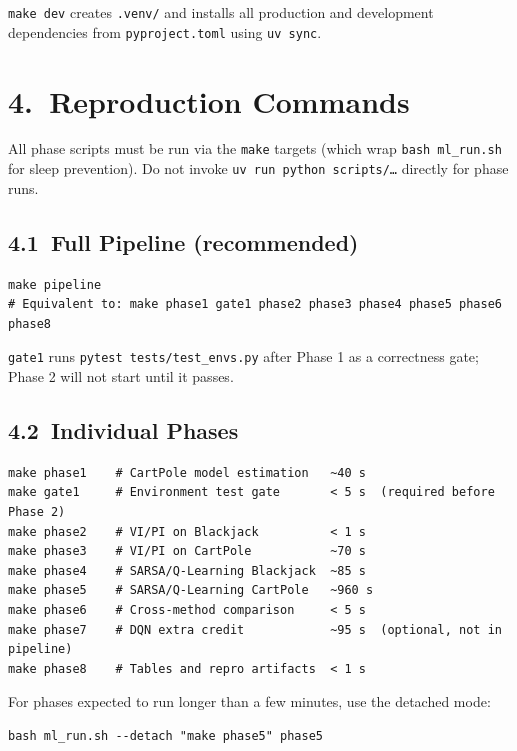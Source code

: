 \documentclass[letterpaper, 11pt]{article}
\begin{document}
\texttt{make dev} creates \texttt{.venv/} and installs all production and development
dependencies from \texttt{pyproject.toml} using \texttt{uv sync}.

\section*{4.\ Reproduction Commands}

All phase scripts must be run via the \texttt{make} targets (which wrap
\texttt{bash ml\_run.sh} for sleep prevention). Do not invoke
\texttt{uv run python scripts/\ldots} directly for phase runs.

\subsection*{4.1\ Full Pipeline (recommended)}

\begin{lstlisting}
make pipeline
# Equivalent to: make phase1 gate1 phase2 phase3 phase4 phase5 phase6 phase8
\end{lstlisting}

\texttt{gate1} runs \texttt{pytest tests/test\_envs.py} after Phase 1 as a
correctness gate; Phase 2 will not start until it passes.

\subsection*{4.2\ Individual Phases}

\begin{lstlisting}
make phase1    # CartPole model estimation   ~40 s
make gate1     # Environment test gate       < 5 s  (required before Phase 2)
make phase2    # VI/PI on Blackjack          < 1 s
make phase3    # VI/PI on CartPole           ~70 s
make phase4    # SARSA/Q-Learning Blackjack  ~85 s
make phase5    # SARSA/Q-Learning CartPole   ~960 s
make phase6    # Cross-method comparison     < 5 s
make phase7    # DQN extra credit            ~95 s  (optional, not in pipeline)
make phase8    # Tables and repro artifacts  < 1 s
\end{lstlisting}

For phases expected to run longer than a few minutes, use the detached mode:

\begin{lstlisting}
bash ml_run.sh --detach "make phase5" phase5
\end{lstlisting}
\end{document}
